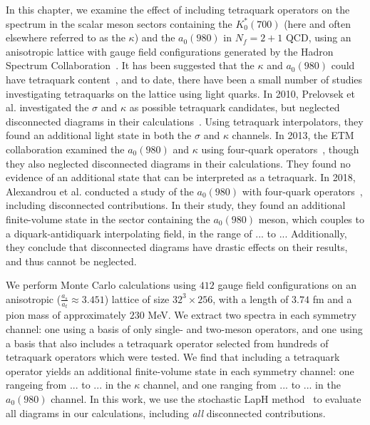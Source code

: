 In this chapter, we examine the effect of including tetraquark operators on the spectrum in the scalar meson sectors containing the $K_0^*(700)$ (here and often elsewhere referred to as the $\kappa$) and the $a_0(980)$ in $N_f = 2 + 1$ QCD, using an anisotropic lattice with gauge field configurations generated by the Hadron Spectrum Collaboration~\cite{}. It has been suggested that the $\kappa$ and $a_0(980)$ could have tetraquark content~\cite{Jaffe:2004ph, AMSLER200461, Close_2002, PhysRevLett.93.212002}, and to date, there have been a small number of studies investigating tetraquarks on the lattice using light quarks. In 2010, Prelovsek et al. investigated the $\sigma$ and $\kappa$ as possible tetraquark candidates, but neglected disconnected diagrams in their calculations~\cite{Prelovsek2010}. Using tetraquark interpolators, they found an additional light state in both the $\sigma$ and $\kappa$ channels. In 2013, the ETM collaboration examined the $a_0(980)$ and $\kappa$ using four-quark operators~\cite{Alexandrou2013}, though they also neglected disconnected diagrams in their calculations. They found no evidence of an additional state that can be interpreted as a tetraquark. In 2018, Alexandrou et al. conducted a study of the $a_0(980)$ with four-quark operators~\cite{Alexandrou2018}, including disconnected contributions. In their study, they found an additional finite-volume state in the sector containing the $a_0(980)$ meson, which couples to a diquark-antidiquark interpolating field, in the range of ... to ... Additionally, they conclude that disconnected diagrams have drastic effects on their results, and thus cannot be neglected.

We perform Monte Carlo calculations using $412$ gauge field configurations on an anisotropic ($\frac{a_s}{a_t} \approx 3.451$) lattice of size $32^3\times 256$, with a length of $3.74$ fm and a pion mass of approximately $230$ MeV. We extract two spectra in each symmetry channel: one using a basis of only single- and two-meson operators, and one using a basis that also includes a tetraquark operator selected from hundreds of tetraquark operators which were tested. We find that including a tetraquark operator yields an additional finite-volume state in each symmetry channel: one rangeing from ... to ... in the $\kappa$ channel, and one ranging from ... to ... in the $a_0(980)$ channel. In this work, we use the stochastic LapH method~\cite{slaph} to evaluate all diagrams in our calculations, including \textit{all} disconnected contributions.

